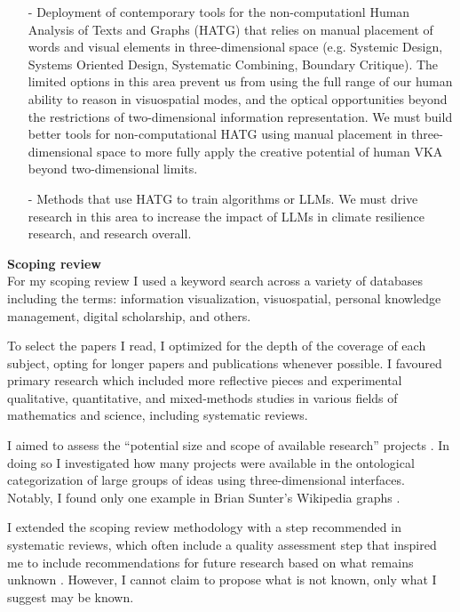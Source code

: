 \begin{enumerate}
\item[-] Deployment of contemporary tools for the non-computationl Human Analysis of Texts and Graphs (HATG) that relies on manual placement of words and visual elements in three-dimensional space (e.g. Systemic Design, Systems Oriented Design, Systematic Combining, Boundary Critique). The limited options in this area prevent us from using the full range of our human ability to reason in visuospatial modes, and the optical opportunities beyond the restrictions of two-dimensional information representation. We must build better tools for non-computational HATG using manual placement in three-dimensional space to more fully apply the creative potential of human VKA beyond two-dimensional limits.
\item[-] Methods that use HATG to train algorithms or LLMs. We must drive research in this area to increase the impact of LLMs in climate resilience research, and research overall. 
\end{enumerate}
  

\noindent \textbf{Scoping review} \\
For my scoping review I used a keyword search across a variety of databases including the terms: information visualization, visuospatial, personal knowledge management, digital scholarship, and others. 

To select the papers I read, I optimized for the depth of the coverage of each subject, opting for longer papers and publications whenever possible. I favoured primary research which included more reflective pieces and experimental qualitative, quantitative, and mixed-methods studies in various fields of mathematics and science, including systematic reviews. 

I aimed to assess the “potential size and scope of available research” projects \citep[p. 95]{grant_typology_2009}. In doing so I investigated how many projects were available in the ontological categorization of large groups of ideas using three-dimensional interfaces. Notably, I found only one example in Brian Sunter’s Wikipedia graphs \citep{sunter_organizing_2022, sunter_3d_2023}. 

I extended the scoping review methodology with a step recommended in systematic reviews, which often include a quality assessment step that inspired me to include recommendations for future research based on what remains unknown \citep[p. 94-95]{grant_typology_2009}. However, I cannot claim to propose what is not known, only what I suggest may be known. 

